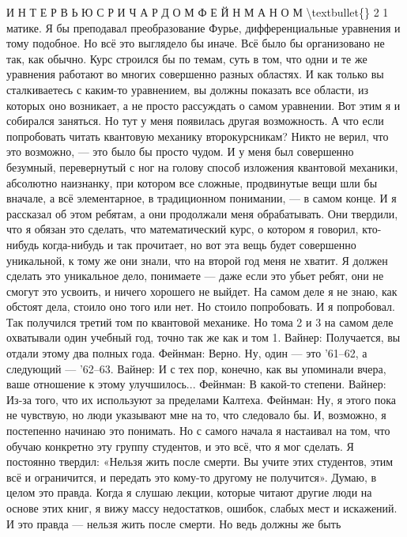\documentclass[10pt,oneside]{article}
\begin{document}
И Н Т Е Р В Ь Ю  С  Р И Ч А Р Д О М  Ф Е Й Н М А Н О М \textbackslash{}textbullet\{\} 2 1 матике. Я бы преподавал преобразование Фурье, дифференциальные уравнения и тому подобное. Но всё это выглядело бы иначе. Всё было бы организовано не так, как обычно. Курс строился бы по темам, суть в том, что одни и те же уравнения работают во многих совершенно разных областях. И как только вы сталкиваетесь с каким-то уравнением, вы должны показать все области, из которых оно возникает, а не просто рассуждать о самом уравнении. Вот этим я и собирался заняться. Но тут у меня появилась другая возможность. А что если попробовать читать квантовую механику второкурсникам? Никто не верил, что это возможно, --- это было бы просто чудом. И у меня был совершенно безумный, перевернутый с ног на голову способ изложения квантовой механики, абсолютно наизнанку, при котором все сложные, продвинутые вещи шли бы вначале, а всё элементарное, в традиционном понимании, --- в самом конце. И я рассказал об этом ребятам, а они продолжали меня обрабатывать. Они твердили, что я обязан это сделать, что математический курс, о котором я говорил, кто-нибудь когда-нибудь и так прочитает, но вот эта вещь будет совершенно уникальной, к тому же они знали, что на второй год меня не хватит. Я должен сделать это уникальное дело, понимаете --- даже если это убьет ребят, они не смогут это усвоить, и ничего хорошего не выйдет. На самом деле я не знаю, как обстоят дела, стоило оно того или нет. Но стоило попробовать. И я попробовал. Так получился третий том по квантовой механике. Но тома 2 и 3 на самом деле охватывали один учебный год, точно так же как и том 1. Вайнер: Получается, вы отдали этому два полных года. Фейнман: Верно. Ну, один --- это '61–62, а следующий --- '62–63. Вайнер: И с тех пор, конечно, как вы упоминали вчера, ваше отношение к этому улучшилось... Фейнман: В какой-то степени. Вайнер: Из-за того, что их используют за пределами Калтеха. Фейнман: Ну, я этого пока не чувствую, но люди указывают мне на то, что следовало бы. И, возможно, я постепенно начинаю это понимать. Но с самого начала я настаивал на том, что обучаю конкретно эту группу студентов, и это всё, что я мог сделать. Я постоянно твердил: «Нельзя жить после смерти. Вы учите этих студентов, этим всё и ограничится, и передать это кому-то другому не получится». Думаю, в целом это правда. Когда я слушаю лекции, которые читают другие люди на основе этих книг, я вижу массу недостатков, ошибок, слабых мест и искажений. И это правда --- нельзя жить после смерти. Но ведь должны же быть\par
\end{document}
